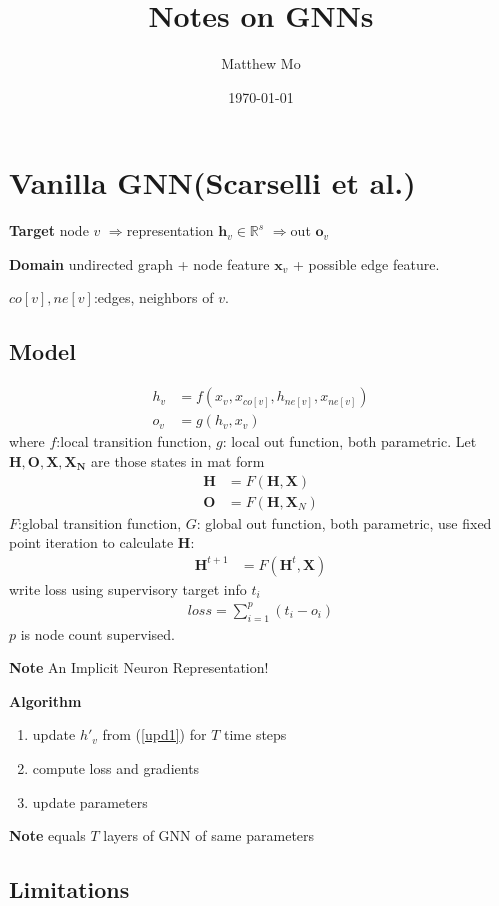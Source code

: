 \documentclass{article}
\title{\textbf{Notes on GNNs}}
\author{Matthew Mo}
\date{\today}
\newcommand{\R}{\mathbb{R}}
\newcommand{\trarr}{$\Rightarrow$}
\newcommand{\bs}[1]{\boldsymbol{#1}}
\newcommand{\alg}{\textbf{Algorithm} }
\newcommand{\note}{\textbf{Note} }
\newcommand{\bt}[1]{\textbf{#1}}
\begin{document}
\maketitle
\section{Vanilla GNN(Scarselli et al.)}

\bt{Target} node $v$ \trarr  representation $\bs h_v \in \R^s$ \trarr  out $\bs o_v$

\bt{Domain} undirected graph + node feature $\bs x_v$ + possible edge feature.

$co[v], ne[v]$:edges, neighbors of $v$.

\subsection{Model} 
\begin{align}
    \label{upd1}
    h_v&=f(x_v, x_{co[v]}, h_{ne[v]}, x_{ne[v]})\\
    o_v&=g(h_v,x_v)
\end{align}
where $f$:local transition function, $g$: local out function, both parametric. Let $\bs{H, O, X, X_N}$ are those states in mat form
\begin{align}
    \bs H&=F(\bs H, \bs X)\\
    \bs O&=F(\bs H, \bs X_N)
\end{align}
$F$:global transition function, $G$: global out function, both parametric, use fixed point iteration to calculate $\bs H$:
\begin{align}
    \bs H^{t+1}&=F(\bs H^t, \bs X)
\end{align}
write loss using supervisory target info $t_i$
\begin{align}
    loss=\sum_{i=1}^p(t_i-o_i)
\end{align}
$p$ is node count supervised.

\note An Implicit Neuron Representation!

\alg 
\begin{enumerate}
    \item update $h'_v$ from (\ref{upd1}) for $T$ time steps
    \item compute loss and gradients
    \item update parameters
\end{enumerate}

\note equals $T$ layers of GNN of same parameters
 
\subsection{Limitations}
\end{document}
